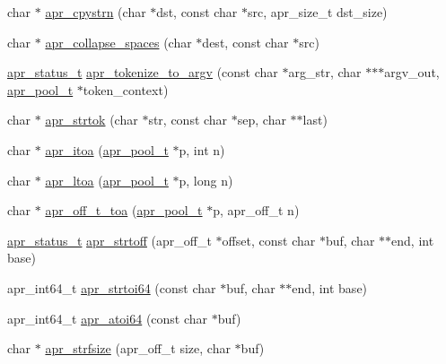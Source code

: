 \begin{DoxyCompactItemize}
\item 
char $\ast$ \hyperlink{group__apr__strings_ga69700a825e82dd646f9f166599040431}{apr\+\_\+cpystrn} (char $\ast$dst, const char $\ast$src, apr\+\_\+size\+\_\+t dst\+\_\+size)
\item 
char $\ast$ \hyperlink{group__apr__strings_gafd92441a5f4fa3b5f5aa49e1f9884bc7}{apr\+\_\+collapse\+\_\+spaces} (char $\ast$dest, const char $\ast$src)
\item 
\hyperlink{group__apr__errno_gaf76ee4543247e9fb3f3546203e590a6c}{apr\+\_\+status\+\_\+t} \hyperlink{group__apr__strings_ga5213cee7e8ba799df9dc2e57f71cd4dd}{apr\+\_\+tokenize\+\_\+to\+\_\+argv} (const char $\ast$arg\+\_\+str, char $\ast$$\ast$$\ast$argv\+\_\+out, \hyperlink{group__apr__pools_gaf137f28edcf9a086cd6bc36c20d7cdfb}{apr\+\_\+pool\+\_\+t} $\ast$token\+\_\+context)
\item 
char $\ast$ \hyperlink{group__apr__strings_ga1cf7fcb5843707ece733e27aad85c516}{apr\+\_\+strtok} (char $\ast$str, const char $\ast$sep, char $\ast$$\ast$last)
\item 
char $\ast$ \hyperlink{group__apr__strings_gae1c780f2d908a286a141e4b885254a9c}{apr\+\_\+itoa} (\hyperlink{group__apr__pools_gaf137f28edcf9a086cd6bc36c20d7cdfb}{apr\+\_\+pool\+\_\+t} $\ast$p, int n)
\item 
char $\ast$ \hyperlink{group__apr__strings_ga578ea3fa78957c6b2e9b8ab4cbfd60b1}{apr\+\_\+ltoa} (\hyperlink{group__apr__pools_gaf137f28edcf9a086cd6bc36c20d7cdfb}{apr\+\_\+pool\+\_\+t} $\ast$p, long n)
\item 
char $\ast$ \hyperlink{group__apr__strings_gabce9fb74bbad08d795389bfe859053d3}{apr\+\_\+off\+\_\+t\+\_\+toa} (\hyperlink{group__apr__pools_gaf137f28edcf9a086cd6bc36c20d7cdfb}{apr\+\_\+pool\+\_\+t} $\ast$p, apr\+\_\+off\+\_\+t n)
\item 
\hyperlink{group__apr__errno_gaf76ee4543247e9fb3f3546203e590a6c}{apr\+\_\+status\+\_\+t} \hyperlink{group__apr__strings_ga1583688e0777398174f62e46a522ae8f}{apr\+\_\+strtoff} (apr\+\_\+off\+\_\+t $\ast$offset, const char $\ast$buf, char $\ast$$\ast$end, int base)
\item 
apr\+\_\+int64\+\_\+t \hyperlink{group__apr__strings_ga1da34829609e8976f498b235afd6cbe4}{apr\+\_\+strtoi64} (const char $\ast$buf, char $\ast$$\ast$end, int base)
\item 
apr\+\_\+int64\+\_\+t \hyperlink{group__apr__strings_gaf0653577ee64efb5406d932db95cce3d}{apr\+\_\+atoi64} (const char $\ast$buf)
\item 
char $\ast$ \hyperlink{group__apr__strings_gaf66522fda6d2dfa540fdc58831405980}{apr\+\_\+strfsize} (apr\+\_\+off\+\_\+t size, char $\ast$buf)
\end{DoxyCompactItemize}


